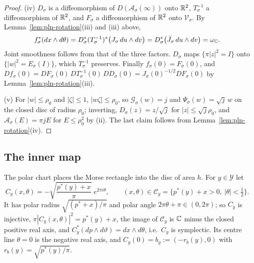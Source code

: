 \begin{proof}
(iv) $D_\sigma$ is a diffeomorphism of $D(\mathcal A_\sigma(\infty))$ onto $\mathbb{R}^2$, $T_\sigma^{-1}$ a diffeomorphism of $\mathbb{R}^2$,
and $F_\sigma$ a diffeomorphism of $\mathbb{R}^2$ onto $\mathcal V_\sigma$. By Lemma~\ref{lem:pln-rotation}(iii) and (iii) above,
\[
 f_\sigma^*(dx\wedge d\theta)=D_\sigma^*(T_\sigma^{-1})^*\bigl(J_\sigma\,du\wedge dv\bigr)=D_\sigma^*\bigl(\bar J_\sigma\,du\wedge dv\bigr)=\omega_{\mathbb{C}} .
\]
Joint smoothness follows from that of the three factors. $D_\sigma$ maps $\{\pi|z|^2=I\}$ onto
$\{|w|^2=E_\sigma(I)\}$, which $T_\sigma^{-1}$ preserves. Finally $f_\sigma(0)=F_\sigma(0)$, and
$Df_\sigma(0)=DF_\sigma(0)\,DT_\sigma^{-1}(0)\,DD_\sigma(0)=J_\sigma(0)^{-1/2}DF_\sigma(0)$ by Lemma~\ref{lem:pln-rotation}(iii).

(v) For $|w|\le\rho_0$ and $|\zeta|\le1$, $|w\zeta|\le\rho_0$, so $\mathcal G_\sigma(w)=j$ and $\Psi_\sigma(w)=\sqrt j\,w$ on the closed disc
of radius $\rho_0$; inverting, $D_\sigma(z)=z/\sqrt j$ for $|z|\le\sqrt j\rho_0$, and $\mathcal A_\sigma(E)=\pi jE$ for
$E\le\rho_0^2$ by (ii). The last claim follows from Lemma~\ref{lem:pln-rotation}(iv).
\end{proof}

\subsection{The inner map}\label{sec:pln-inner}

The polar chart places the Morse rectangle into the disc of area $h$. For $y\in\mathcal Y$ let
\begin{equation}\label{eq:pln-chart}
 C_y(x,\theta)=-\sqrt{\frac{p^*(y)+x}\pi}\;e^{2\pi i\theta},\qquad
 (x,\theta)\in\mathcal C_y=\{p^*(y)+x>0,\ |\theta|<\tfrac12\}.
\end{equation}
It has polar radius $\sqrt{(p^*+x)/\pi}$ and polar angle $2\pi\theta+\pi\in(0,2\pi)$; so $C_y$ is injective,
$\pi|C_y(x,\theta)|^2=p^*(y)+x$, the image of $\mathcal C_y$ is $\mathbb{C}$ minus the closed positive real axis, and
$C_y^*(dp\wedge d\vartheta)=dx\wedge d\theta$, i.e.\ $C_y$ is symplectic. Its centre line $\theta=0$ is the negative real
axis, and $C_y(0)=b_y:=(-r_b(y),0)$ with $r_b(y)=\sqrt{p^*(y)/\pi}$.

